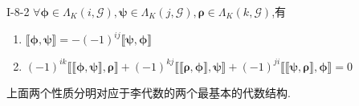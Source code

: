 \documentclass[../main.tex]{subfiles}
\begin{document}
\begin{theorem}
  {}{I-8-2}
  $\forall \bm{\phi}\in \Lambda_K(i,\mathscr{G}) ,\bm{\psi} \in \Lambda_K(j,\mathscr{G}),\bm{\rho} \in \Lambda_K(k,\mathscr{G}) $,有
  \begin{enumerate}
    \item $\llbracket \bm{\phi} ,\bm{\psi}  \rrbracket = -(-1)^{ij} \llbracket \bm{\psi},\bm{\phi} \rrbracket $ 
    \item $(-1)^{ik} \llbracket \llbracket \bm{\phi} ,\bm{\psi}  \rrbracket ,\bm{\rho}  \rrbracket + (-1)^{kj}\llbracket \llbracket \bm{\rho},\bm{\phi} \rrbracket ,\bm{\psi}  \rrbracket  + (-1)^{ji} \llbracket \llbracket \bm{\psi} ,\bm{\rho}  \rrbracket ,\bm{\phi}  \rrbracket = 0$
  \end{enumerate}
\end{theorem}
\begin{note}
  上面两个性质分明对应于李代数的两个最基本的代数结构.
\end{note}
\end{document}
